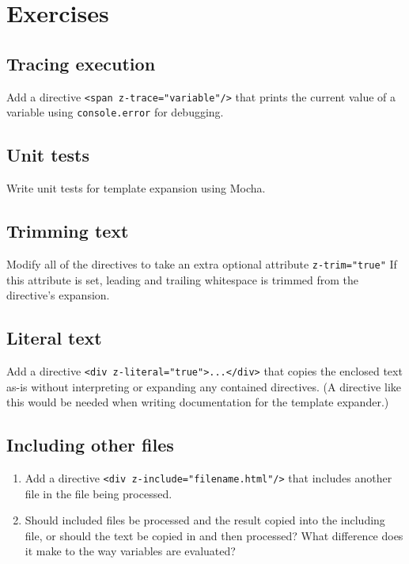 \documentclass[krantzl]{krantz}
\begin{document}
\section{Exercises}\label{page-templates-exercises}

\subsection*{Tracing execution}


Add a directive \texttt{<span z-trace="variable"/>}
that prints the current value of a variable using \texttt{console.error} for debugging.

\subsection*{Unit tests}


Write unit tests for template expansion using Mocha.

\subsection*{Trimming text}


Modify all of the directives to take an extra optional attribute \texttt{z-trim="true"}
If this attribute is set,
leading and trailing whitespace is trimmed from the directive’s expansion.

\subsection*{Literal text}


Add a directive \texttt{<div z-literal="true">...</div>} that copies the enclosed text as-is
without interpreting or expanding any contained directives.
(A directive like this would be needed when writing documentation for the template expander.)

\subsection*{Including other files}

\begin{enumerate}

\item 

Add a directive \texttt{<div z-include="filename.html"/>} that includes another file
    in the file being processed.



\item 

Should included files be processed and the result copied into the including file,
    or should the text be copied in and then processed?
    What difference does it make to the way variables are evaluated?



\end{enumerate}
\end{document}

